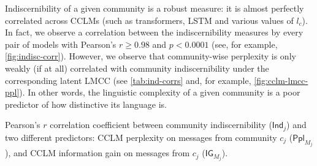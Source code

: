 \documentclass[11pt]{article}
\newcommand\Ppl{\mathsf{Ppl}}
\newcommand\IG{\mathsf{IG}}
\newcommand\Ind{\mathsf{Ind}}
\begin{document}
Indiscernibility of a given community is a robust measure: it is
almost perfectly correlated across CCLMs (such as transformers, LSTM
and various values of $l_c$).  In fact, we observe a correlation
between the indiscernibility measures by every pair of models with
Pearson's $r \geq 0.98$ and $p < 0.0001$ (see, for example,
\cref{fig:indisc-corr}).
%
%
However, we observe that community-wise perplexity is only weakly (if at all) 
correlated with community indiscernibility under the corresponding latent 
LMCC (see \cref{tab:ind-corrs} and, for example, \cref{fig:cclm-lmcc-ppl}).
In other words, the linguistic complexity of a given community
is a poor predictor of how distinctive its language is.
%
\begin{table}
  \small
  \centering
  
  \caption{ Pearson's $r$ correlation coefficient between community
    indiscernibility ($\Ind_j$) and two different predictors: CCLM
    perplexity on messages from community $c_j$ ($\Ppl_{M_j}$), and
    CCLM information gain on messages from $c_j$ ($\IG_{M_j}$).  }
  \label{tab:ind-corrs}
\end{table}
%
\end{document}
